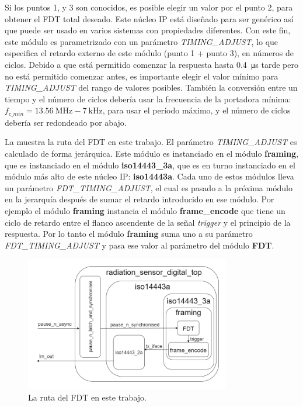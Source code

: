 \documentclass[a4paper, twoside, 11pt]{report}
\begin{document}
Si los puntos 1, y 3 son conocidos, es posible elegir un valor por el punto 2, para obtener el FDT total deseado. Este núcleo IP está diseñado para ser genérico así que puede ser usado en varios sistemas con propiedades diferentes. Con este fin, este módulo es parametrizado con un parámetro \textit{TIMING\_ADJUST}, lo que especifica el retardo externo de este módulo (punto 1 + punto 3), en números de ciclos. Debido a que está permitido comenzar la respuesta hasta \SI{0,4}{\micro\second} tarde pero no está permitido comenzar antes, es importante elegir el valor mínimo para  \textit{TIMING\_ADJUST} del rango de valores posibles. También la conversión entre un tiempo y el número de ciclos debería usar la frecuencia de la portadora mínima: $f_{c\_min} = \SI{13.56}{\mega\hertz} - \SI{7}{\kilo\hertz}$, para usar el período máximo, y el número de ciclos debería ser redondeado por abajo.

La  muestra la ruta del FDT en este trabajo. El parámetro \textit{TIMING\_ADJUST} es calculado de forma jerárquica. Este módulo es instanciado en el módulo \textbf{framing}, que es instanciado en el módulo \textbf{iso14443\_3a}, que es en turno instanciado en el módulo más alto de este núcleo IP: \textbf{iso14443a}. Cada uno de estos módulos lleva un parámetro \textit{FDT\_TIMING\_ADJUST}, el cual es pasado a la próxima módulo en la jerarquía después de sumar el retardo introducido en ese módulo. Por ejemplo el módulo \textbf{framing} instancia el módulo \textbf{frame\_encode} que tiene un ciclo de retardo entre el flanco ascendente de la señal \textit{trigger} y el principio de la respuesta. Por lo tanto el módulo \textbf{framing} suma uno a su parámetro \textit{FDT\_TIMING\_ADJUST} y pasa ese valor al parámetro del módulo \textbf{FDT}.

\begin{figure}[htb]
  \centering
  \includegraphics[width=0.8\textwidth]{./img/fdt_path3.drawio}
  \caption{La ruta del FDT en este trabajo.}
  \label{fig:fdt_path}
\end{figure}
\end{document}
